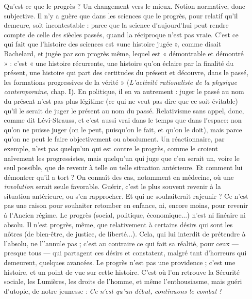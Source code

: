 Qu'est-ce que le progrès ? Un changement vers le mieux. Notion normative,
donc subjective. Il n’y a guère que dans les sciences que le progrès, pour
relatif qu’il demeure, soit incontestable : parce que la science d’aujourd’hui
peut rendre compte de celle des siècles passés, quand la réciproque n'est pas
vraie. C’est ce qui fait que l’histoire des sciences est «une histoire jugée »,
comme disait Bachelard, et jugée par son progrès même, lequel est « démontrable
et démontré » : c’est « une histoire récurrente, une histoire qu’on éclaire
par la finalité du présent, une histoire qui part des certitudes du présent et
découvre, dans le passé, les formations progressives de la vérité » ({\it L'activité
rationaliste de la physique contemporaine}, chap. I). En politique, il en va
autrement : juger le passé au nom du présent n’est pas plus légitime (ce qui ne
veut pas dire que ce soit évitable) qu’il le serait de juger le présent au nom du
passé. Relativisme sans appel, donc, comme dit Lévi-Strauss, et c’est aussi vrai
dans le temps que dans l’espace: non qu’on ne puisse juger (on le peut,
puisqu'on le fait, et qu’on le doit), mais parce qu’on ne peut le faire objectivement
ou absolument. Un réactionnaire, par exemple, n’est pas quelqu'un qui
est contre le progrès, comme le croient naïvement les progressistes, mais
quelqu'un qui juge que c’en serait un, voire le seul possible, que de revenir à
telle ou telle situation antérieure. Et comment lui démontrer qu’il a tort ? On
connaît des cas, notamment en médecine, où une {\it involution} serait seule favorable.
Guérir, c’est le plus souvent revenir à la situation antérieure, ou s’en rapprocher.
Et qui ne souhaiterait rajeunir ? Ce n’est pas une raison pour souhaiter
retomber en enfance, ni, encore moins, pour revenir à l’Ancien régime. Le progrès
(social, politique, économique...) n’est ni linéaire ni absolu. Il n’est progrès,
même, que relativement à certains désirs qui sont les nôtres (de bien-être,
de justice, de liberté...). Cela, qui lui interdit de prétendre à l'absolu, ne
l’'annule pas ; c’est au contraire ce qui fait sa réalité, pour ceux — presque tous
— qui partagent ces désirs et constatent, malgré tant d’horreurs qui demeurent,
quelques avancées. Le progrès n’est pas une providence ; c’est une histoire, et
un point de vue sur cette histoire. C’est où l’on retrouve la Sécurité sociale, les
Lumières, les droits de l’homme, et même l'enthousiasme, mais guéri d’utopie,
de notre jeunesse : {\it Ce n'est qu'un début, continuons le combat !}

